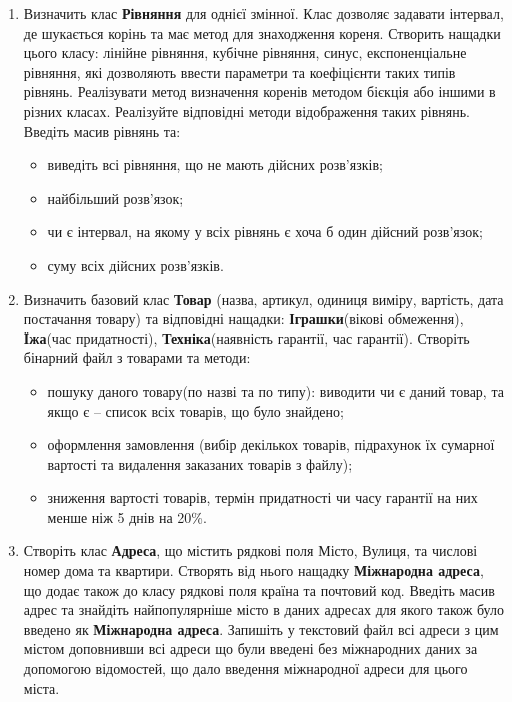 \documentclass[a5paper,titlepage,openany,twoside,
]
{book_unv}%
\begin{document}
\begin{enumerate}
\begin{enumerate}
\begin{enumerate}
\item
Визначить клас \textbf{Рівняння} для однієї змінної. Клас дозволяє задавати інтервал,
де шукається корінь та має метод для знаходження кореня.
Створить нащадки цього класу: лінійне рівняння, кубічне рівняння, синус,
експоненціальне рівняння, які дозволяють ввести параметри та коефіцієнти таких типів
рівнянь. Реалізувати метод визначення коренів методом бієкція або іншими
в різних класах. Реалізуйте відповідні методи відображення таких рівнянь.
Введіть масив рівнянь та:
\begin{itemize}
\item
виведіть всі рівняння, що не мають дійсних розв'язків;
\item
найбільший розв'язок;
\item
чи є інтервал, на якому у всіх рівнянь є хоча б один дійсний розв'язок;
\item
суму всіх дійсних розв'язків.
\end{itemize}

\item
Визначить базовий клас \textbf{Товар} 
(назва, артикул, одиниця виміру, вартість, дата постачання товару) та відповідні нащадки:
\textbf{Іграшки}(вікові обмеження), \textbf{Їжа}(час придатності), \textbf{Техніка}(наявність гарантії, час гарантії).
Створіть бінарний файл з товарами та методи:
\begin{itemize}
\item
 пошуку даного товару(по назві та по типу): 
виводити чи є даний товар, та якщо є -- 
список всіх товарів, що було знайдено; 
\item
оформлення замовлення (вибір декількох товарів, 
підрахунок їх сумарної вартості та видалення
 заказаних товарів з файлу);
\item
зниження вартості товарів, термін придатності чи часу гарантії на них менше ніж 5 днів на 20\%.
\end{itemize}

\item
Створіть клас \textbf{Адреса}, що містить рядкові поля Місто, Вулиця, та числові номер дома та квартири. 
Створять від нього нащадку \textbf{Міжнародна адреса}, що додає також до класу рядкові поля країна та почтовий код.
Введіть масив адрес та знайдіть найпопулярніше місто в даних адресах для якого також було введено як \textbf{Міжнародна адреса}. 
Запишіть у текстовий файл всі адреси з цим містом доповнивши всі адреси що були введені без міжнародних даних
за допомогою відомостей, що дало введення міжнародної адреси для цього міста.


\end{enumerate}
\end{enumerate}
\end{enumerate}
\end{document}
